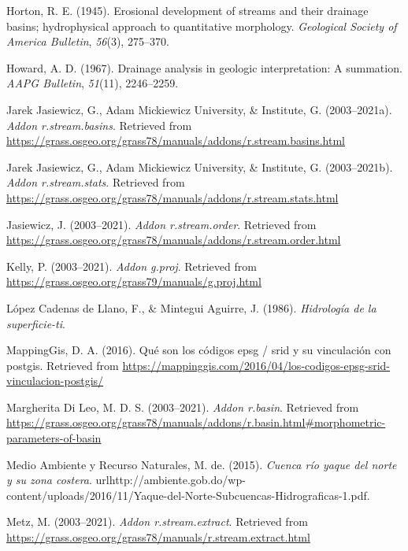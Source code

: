 \documentclass[11pt,]{article}
\begin{document}
\hypertarget{ref-horton1945erosional}{}
Horton, R. E. (1945). Erosional development of streams and their
drainage basins; hydrophysical approach to quantitative morphology.
\emph{Geological Society of America Bulletin}, \emph{56}(3), 275--370.

\hypertarget{ref-howard1967drainage}{}
Howard, A. D. (1967). Drainage analysis in geologic interpretation: A
summation. \emph{AAPG Bulletin}, \emph{51}(11), 2246--2259.

\hypertarget{ref-streambasinsjareck}{}
Jarek Jasiewicz, G., Adam Mickiewicz University, \& Institute, G.
(2003--2021a). \emph{Addon r.stream.basins}. Retrieved from
\url{https://grass.osgeo.org/grass78/manuals/addons/r.stream.basins.html}

\hypertarget{ref-streamstats}{}
Jarek Jasiewicz, G., Adam Mickiewicz University, \& Institute, G.
(2003--2021b). \emph{Addon r.stream.stats}. Retrieved from
\url{https://grass.osgeo.org/grass78/manuals/addons/r.stream.stats.html}

\hypertarget{ref-streamorder}{}
Jasiewicz, J. (2003--2021). \emph{Addon r.stream.order}. Retrieved from
\url{https://grass.osgeo.org/grass78/manuals/addons/r.stream.order.html}

\hypertarget{ref-gproj}{}
Kelly, P. (2003--2021). \emph{Addon g.proj}. Retrieved from
\url{https://grass.osgeo.org/grass79/manuals/g.proj.html}

\hypertarget{ref-lopez1986hidrologia}{}
López Cadenas de Llano, F., \& Mintegui Aguirre, J. (1986).
\emph{Hidrología de la superficie-ti}.

\hypertarget{ref-EPSG}{}
MappingGis, D. A. (2016). Qué son los códigos epsg / srid y su
vinculación con postgis. Retrieved from
\url{https://mappinggis.com/2016/04/los-codigos-epsg-srid-vinculacion-postgis/}

\hypertarget{ref-basinmargherita}{}
Margherita Di Leo, M. D. S. (2003--2021). \emph{Addon r.basin}.
Retrieved from
\url{https://grass.osgeo.org/grass78/manuals/addons/r.basin.html\#morphometric-parameters-of-basin}

\hypertarget{ref-Mmar2015cuenca}{}
Medio Ambiente y Recurso Naturales, M. de. (2015). \emph{Cuenca río
yaque del norte y su zona costera}.
urlhttp://ambiente.gob.do/wp-content/uploads/2016/11/Yaque-del-Norte-Subcuencas-Hidrograficas-1.pdf.

\hypertarget{ref-streamnextractmarkus}{}
Metz, M. (2003--2021). \emph{Addon r.stream.extract}. Retrieved from
\url{https://grass.osgeo.org/grass78/manuals/r.stream.extract.html}
\end{document}
